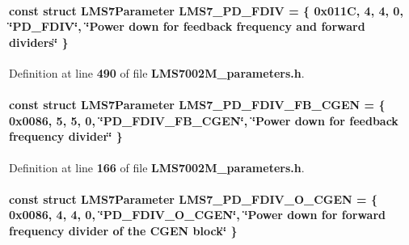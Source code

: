 \paragraph[{L\+M\+S7\+\_\+\+P\+D\+\_\+\+F\+D\+IV}]{\setlength{\rightskip}{0pt plus 5cm}const struct {\bf L\+M\+S7\+Parameter} L\+M\+S7\+\_\+\+P\+D\+\_\+\+F\+D\+IV = \{ 0x011\+C, 4, 4, 0, \char`\"{}\+P\+D\+\_\+\+F\+D\+I\+V\char`\"{}, \char`\"{}\+Power down for feedback frequency and forward dividers\char`\"{} \}\hspace{0.3cm}{\ttfamily [static]}}\label{LMS7002M__parameters_8h_ab47d4586888c3c6081c07409d6ed33bb}


Definition at line {\bf 490} of file {\bf L\+M\+S7002\+M\+\_\+parameters.\+h}.

\paragraph[{L\+M\+S7\+\_\+\+P\+D\+\_\+\+F\+D\+I\+V\+\_\+\+F\+B\+\_\+\+C\+G\+EN}]{\setlength{\rightskip}{0pt plus 5cm}const struct {\bf L\+M\+S7\+Parameter} L\+M\+S7\+\_\+\+P\+D\+\_\+\+F\+D\+I\+V\+\_\+\+F\+B\+\_\+\+C\+G\+EN = \{ 0x0086, 5, 5, 0, \char`\"{}\+P\+D\+\_\+\+F\+D\+I\+V\+\_\+\+F\+B\+\_\+\+C\+G\+E\+N\char`\"{}, \char`\"{}\+Power down for feedback frequency divider\char`\"{} \}\hspace{0.3cm}{\ttfamily [static]}}\label{LMS7002M__parameters_8h_ad67e232de95b5f348e748c368dc78a11}


Definition at line {\bf 166} of file {\bf L\+M\+S7002\+M\+\_\+parameters.\+h}.

\paragraph[{L\+M\+S7\+\_\+\+P\+D\+\_\+\+F\+D\+I\+V\+\_\+\+O\+\_\+\+C\+G\+EN}]{\setlength{\rightskip}{0pt plus 5cm}const struct {\bf L\+M\+S7\+Parameter} L\+M\+S7\+\_\+\+P\+D\+\_\+\+F\+D\+I\+V\+\_\+\+O\+\_\+\+C\+G\+EN = \{ 0x0086, 4, 4, 0, \char`\"{}\+P\+D\+\_\+\+F\+D\+I\+V\+\_\+\+O\+\_\+\+C\+G\+E\+N\char`\"{}, \char`\"{}\+Power down for forward frequency divider of the C\+G\+E\+N block\char`\"{} \}\hspace{0.3cm}{\ttfamily [static]}}\label{LMS7002M__parameters_8h_a0afb7b2969ccdaaf5d99e9e6d5a4a07d}


